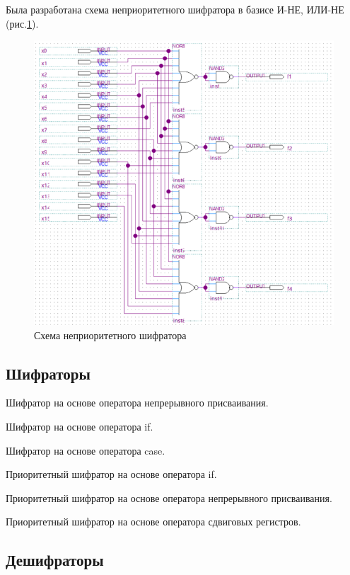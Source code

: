 \documentclass[a4paper,14pt]{article}
\begin{document}
Была разработана схема неприоритетного шифратора в базисе И-НЕ, ИЛИ-НЕ (рис.\ref{fig:z1_schema}).
\begin{figure}[H]
	\centering
	\includegraphics[width=0.9\linewidth]{imgs/z1_schema}
	\caption{Схема неприоритетного шифратора}
	\label{fig:z1_schema}
\end{figure}

\subsection{Шифраторы}

Шифратор на основе оператора непрерывного присваивания.

Шифратор на основе оператора if.

Шифратор на основе оператора case.

Приоритетный шифратор на основе оператора if.

Приоритетный шифратор на основе оператора непрерывного присваивания.

Приоритетный шифратор на основе оператора сдвиговых регистров.

\subsection{Дешифраторы}
\end{document}
